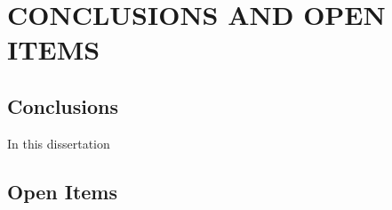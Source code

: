 %
%
%
\chapter{\uppercase {Conclusions and Open Items}}
\label{sec::Conclusions}


\section{Conclusions}
\label{sec::Conclusions_Conclusions}

In this dissertation

\section{Open Items}
\label{sec::Conclusions_Open_Items}